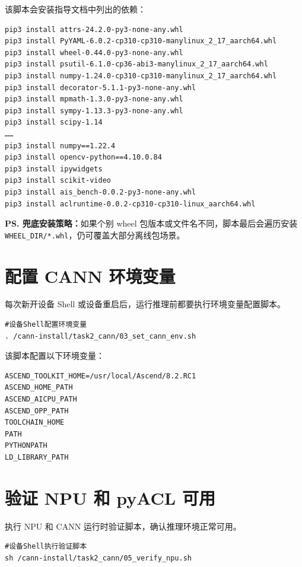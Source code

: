 该脚本会安装指导文档中列出的依赖：

\begin{lstlisting}[caption={依赖包列表}, basicstyle=\ttfamily\footnotesize]
pip3 install attrs-24.2.0-py3-none-any.whl
pip3 install PyYAML-6.0.2-cp310-cp310-manylinux_2_17_aarch64.whl
pip3 install wheel-0.44.0-py3-none-any.whl
pip3 install psutil-6.1.0-cp36-abi3-manylinux_2_17_aarch64.whl
pip3 install numpy-1.24.0-cp310-cp310-manylinux_2_17_aarch64.whl
pip3 install decorator-5.1.1-py3-none-any.whl
pip3 install mpmath-1.3.0-py3-none-any.whl
pip3 install sympy-1.13.3-py3-none-any.whl
pip3 install scipy-1.14
……
pip3 install numpy==1.22.4
pip3 install opencv-python==4.10.0.84
pip3 install ipywidgets
pip3 install scikit-video
pip3 install ais_bench-0.0.2-py3-none-any.whl
pip3 install aclruntime-0.0.2-cp310-cp310-linux_aarch64.whl
\end{lstlisting}

\noindent\textbf{PS. 兜底安装策略：}如果个别 wheel 包版本或文件名不同，脚本最后会遍历安装 \texttt{WHEEL\_DIR/*.whl}，仍可覆盖大部分离线包场景。

\section{配置 CANN 环境变量}

每次新开设备 Shell 或设备重启后，运行推理前都要执行环境变量配置脚本。

\begin{lstlisting}[style=shell, caption={配置环境变量}]
#设备Shell配置环境变量
. /cann-install/task2_cann/03_set_cann_env.sh
\end{lstlisting}

该脚本配置以下环境变量：

\begin{lstlisting}[caption={环境变量}]
ASCEND_TOOLKIT_HOME=/usr/local/Ascend/8.2.RC1
ASCEND_HOME_PATH
ASCEND_AICPU_PATH
ASCEND_OPP_PATH
TOOLCHAIN_HOME
PATH
PYTHONPATH
LD_LIBRARY_PATH
\end{lstlisting}


\section{验证 NPU 和 pyACL 可用}

执行 NPU 和 CANN 运行时验证脚本，确认推理环境正常可用。

\begin{lstlisting}[style=shell, caption={验证 NPU}]
#设备Shell执行验证脚本
sh /cann-install/task2_cann/05_verify_npu.sh
\end{lstlisting}

